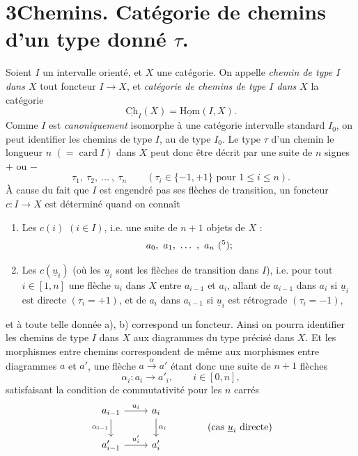 \documentclass[11pt]{article}
\newcommand{\printedpage}[1]{\marginpar{\footnotesize p.~#1}}
\newcommand{\msp}[1]{\marginpar{\footnotesize [#1]}}
\newcommand{\Ch}{\underline{\mathrm{Ch}}}
\newcommand{\uHom}{\underline{\mathrm{Hom}}}
\begin{document}
\printedpage{9}

\msp{page 13}

\section*{3\quad Chemins. Catégorie de chemins d'un type donné $\tau$.}

Soient $I$ un intervalle orienté, et $X$ une catégorie. On appelle \textit{chemin de type $I$ dans $X$} tout foncteur $I \longrightarrow X$, et \textit{catégorie de chemins de type $I$ dans $X$} la catégorie
\[
\Ch_I(X) = \uHom(I,X).
\]
Comme $I$ est \textit{canoniquement} isomorphe à une catégorie intervalle standard $I_0$, on peut identifier les chemins de type $I$, au de type $I_0$. Le type $\tau$ d'un chemin le longueur $n$ $(= \operatorname{card} I)$ dans $X$ peut donc être décrit par une suite de $n$ signes $+$ ou $-$ %
\[
\tau_1,\ \tau_2,\ \dots\ ,\ \tau_n \qquad (\tau_i \in \{-1,+1\} \text{ pour } 1 \leq i \leq n).
\]
À cause du fait que $I$ est engendré pas ses flèches de transition, un foncteur $c : I \longrightarrow X$ est déterminé quand on connaît %

\begin{enumerate}
\item[a)] Les $c(i)$ $(i \in I)$, i.e. une suite de $n+1$ objets de $X$ :
\[
a_0,\ a_1,\ \dots\ ,\ a_n\ (\text{\footnotemark[5]});
\]

\item[b)] Les $c(\underline{u}_i)$ (où les $\underline{u}_i$ sont les flèches de transition dans $I$), i.e. pour tout $i \in [1,n]$ une flèche $u_i$ dans $X$ entre $a_{i-1}$ et $a_i$, allant de $a_{i-1}$ dans $a_i$ si $\underline{u}_i$ est directe $(\tau_i = +1)$, et de $a_i$ dans $a_{i-1}$ si $\underline{u}_i$ est rétrograde $(\tau_i = -1)$,
\end{enumerate}

et à toute telle donnée a), b) correspond un foncteur. Ainsi on pourra identifier les chemins de type $I$ \msp{page 14} dans $X$ aux diagrammes du type précisé dans $X$. Et les morphismes entre chemins correspondent de même aux morphismes entre diagrammes $a$ et $a'$, une flèche $a \xrightarrow{\alpha} a'$ étant donc une suite de $n+1$ flèches
\[
\alpha_i : a_i \longrightarrow a'_i, \qquad i \in [0,n],
\]
satisfaisant la condition de commutativité pour les $n$ carrés
\[
\begin{tikzcd}
a_{i-1} \arrow[r, "u_i"] \arrow[d, "\alpha_{i-1}"'] & a_i \arrow[d, "\alpha_i"] \\
a'_{i-1} \arrow[r, "u'_i"] & a'_i
\end{tikzcd}
\qquad\qquad \text{(cas $\underline{u}_i$ directe)}
\]
\end{document}
